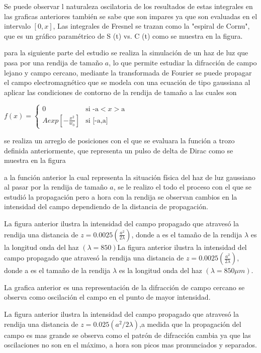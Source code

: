\documentclass[11pt,letterpaper,twocolumn]{article}
\begin{document}
 
 Se puede observar l naturaleza oscilatoria de los resultados de estas integrales en las graficas anteriores también se sabe que son impares ya que son evaluadas en el intervalo $[0,x]$, 
Las integrales de Fresnel se trazan como la "espiral de Cornu", que es un gráfico paramétrico de S (t) vs. C (t) como se muestra en la figura.


para la siguiente parte del estudio se realiza la simulación de un haz de luz que pasa por una rendija de tamaño $a$, lo que permite estudiar la difracción de campo lejano y campo cercano, mediante la transformada de Fourier se puede propagar el campo electromagnético que se modela con una ecuación de tipo gaussiana al aplicar las condiciones de contorno de la rendija de tamaño a las cuales son

$ f(x) = \left \{ \begin{matrix} 0 & \mbox{si } \mbox{-a}<x> \mbox{a}
\\ Aexp\left[-\frac{x^{2}}{w_{0}}\right] & \mbox{si } \mbox{[-a,a]}\end{matrix}\right. $

se realiza un arreglo de posiciones con el que se evaluara  la función a trozo definida anteriormente, que representa un pulso de delta de Dirac como se muestra en la figura
 

a la función anterior la cual representa la situación física del haz de luz gaussiano al pasar por la rendija de tamaño $a$, se le realizo el todo el proceso con el que se estudió la propagación pero a hora con la rendija se observan cambios en la intensidad del campo dependiendo de la distancia de propagación.



La figura anterior ilustra la intensidad del campo propagado que atravesó la rendija una distancia de $z = 0.0025(\frac{a^{2}}{2\lambda})$,  donde a es el tamaño de la rendija $\lambda$ es la longitud  onda del haz $(\lambda = 850 )$La figura anterior ilustra la intensidad del campo propagado que atravesó la rendija una distancia de $z = 0.0025(\frac{a^{2}}{2\lambda})$,  donde a es el tamaño de la rendija $\lambda$ es la longitud  onda del haz $(\lambda = 850 \mu m )$.

La grafica anterior es una representación de la difracción de campo cercano se observa como oscilación el campo en el punto de mayor intensidad.


La figura anterior ilustra la intensidad del campo propagado que atravesó la rendija una distancia de $z = 0.025(a^{2}/2\lambda)$,a medida que la propagación del campo es mas grande se observa como el patrón de difracción cambia ya que las oscilaciones no son en el máximo, a hora son picos mas pronunciados  y separados.
\end{document}
